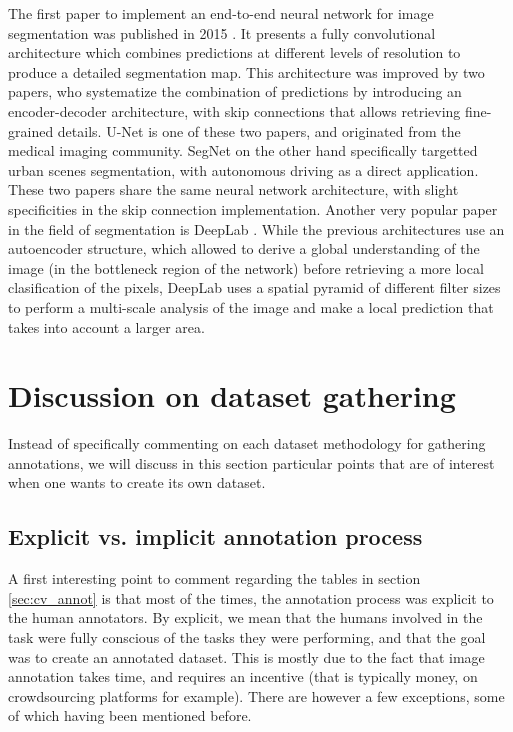 The first paper to implement an end-to-end neural network for image segmentation was published in 2015 \cite{long2015fully}. It presents a fully convolutional architecture which combines predictions at different levels of resolution to produce a detailed segmentation map. This architecture was improved by two papers, who systematize the combination of predictions by introducing an encoder-decoder architecture, with skip connections that allows retrieving fine-grained details. U-Net \cite{ronneberger2015u} is one of these two papers, and originated from the medical imaging community. SegNet \cite{badrinarayanan2017segnet} on the other hand specifically targetted urban scenes segmentation, with autonomous driving as a direct application. These two papers share the same neural network architecture, with slight specificities in the skip connection implementation. Another very popular paper in the field of segmentation is DeepLab \cite{chen2017deeplab}. While the previous architectures use an autoencoder structure, which allowed to derive a global understanding of the image (in the bottleneck region of the network) before retrieving a more local clasification of the pixels, DeepLab uses a spatial pyramid of different filter sizes to perform a multi-scale analysis of the image and make a local prediction that takes into account a larger area.

\section{Discussion on dataset gathering}

Instead of specifically commenting on each dataset methodology for gathering annotations, we will discuss in this section particular points that are of interest when one wants to create its own dataset. 

\subsection{Explicit vs. implicit annotation process}
A first interesting point to comment regarding the tables in section \ref{sec:cv_annot} is that most of the times, the annotation process was explicit to the human annotators. By explicit, we mean that the humans involved in the task were fully conscious of the tasks they were performing, and that the goal was to create an annotated dataset. This is mostly due to the fact that image annotation takes time, and requires an incentive (that is typically money, on crowdsourcing platforms for example). There are however a few exceptions, some of which having been mentioned before. 


